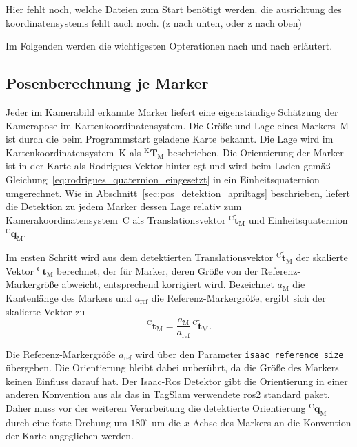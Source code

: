 Hier fehlt noch, welche Dateien zum Start benötigt werden. 
die ausrichtung des koordinatensystems fehlt auch noch. (z nach unten, oder z nach oben)

Im Folgenden werden die wichtigesten Opterationen nach und nach erläutert. 

\subsection{Posenberechnung je Marker}
\label{subsec:pos_posenberechnung}
Jeder im Kamerabild erkannte Marker liefert eine eigenständige Schätzung der Kamerapose im Kartenkoordinatensystem.
Die Größe und Lage eines Markers~$\mathrm{M}$ ist durch die beim Programmstart geladene Karte bekannt.
Die Lage wird im Kartenkoordinatensystem~$\mathrm{K}$ als $^{\mathrm{K}}\mathbf{T}_{\mathrm{M}}$ beschrieben.
Die Orientierung der Marker ist in der Karte als Rodrigues-Vektor hinterlegt und wird beim Laden gemäß
Gleichung~\eqref{eq:rodrigues_quaternion_eingesetzt} in ein Einheitsquaternion umgerechnet.
Wie in Abschnitt~\ref{sec:pos_detektion_apriltags} beschrieben, liefert die Detektion zu jedem Marker
dessen Lage relativ zum Kamerakoordinatensystem~$\mathrm{C}$ als Translationsvektor $^{\mathrm{C}}\tilde{\mathbf{t}}_{\mathrm{M}}$ und
Einheitsquaternion $^{\mathrm{C}}\mathbf{q}_{\mathrm{M}}$.

Im ersten Schritt wird aus dem detektierten Translationsvektor $^{\mathrm{C}}\tilde{\mathbf{t}}_{\mathrm{M}}$
der skalierte Vektor $^{\mathrm{C}}\mathbf{t}_{\mathrm{M}}$ berechnet, der für Marker, deren Größe von der
Referenz-Markergröße abweicht, entsprechend korrigiert wird.
Bezeichnet $a_{\mathrm{M}}$ die Kantenlänge des Markers und $a_{\mathrm{ref}}$ die Referenz-Markergröße, ergibt sich der skalierte Vektor zu
\begin{equation}
^{\mathrm{C}}\mathbf{t}_{\mathrm{M}} = \frac{a_{\mathrm{M}}}{a_{\mathrm{ref}}}\,{^{\mathrm{C}}\tilde{\mathbf{t}}_{\mathrm{M}}}.
\label{eq:pos_skalierung}
\end{equation}


Die Referenz-Markergröße $a_{\mathrm{ref}}$ wird über den Parameter \texttt{isaac\_reference\_size} übergeben.
Die Orientierung bleibt dabei unberührt, da die Größe des Markers keinen Einfluss darauf hat.
Der Isaac-Ros Detektor gibt die Orientierung in einer anderen Konvention aus als das in TagSlam verwendete \gls{ros2} standard paket.
Daher muss vor der weiteren Verarbeitung die detektierte Orientierung $^{\mathrm{C}}\mathbf{q}_{\mathrm{M}}$ durch eine feste
Drehung um $180^\circ$ um die $x$-Achse des Markers an die Konvention der Karte angeglichen werden.

